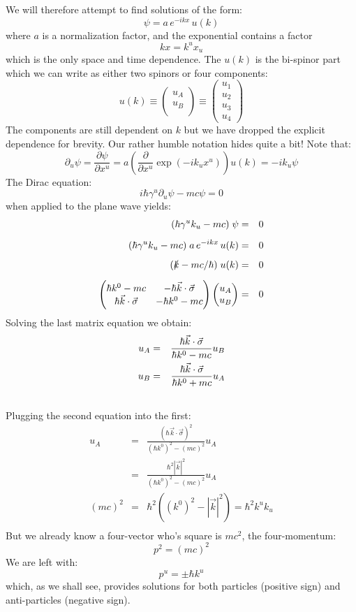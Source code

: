 \documentclass[12pt]{book}
\begin{document}
We will therefore attempt to find solutions of the form:
$$\psi = a \, e^{-ikx} \, u(k)$$
where $a$ is a normalization factor, and the exponential contains a factor
$$kx = k^u x_u$$
which is the only space and time dependence.  The $u(k)$ is the bi-spinor part which we can write as either two spinors or four components:
$$u(k) \equiv \begin{pmatrix} u_A \\ u_B \\ \end{pmatrix} \equiv 
\begin{pmatrix} u_1 \\ u_2\\ u_3 \\ u_4 \end{pmatrix}
$$
The components are still dependent on $k$ but we have dropped the explicit dependence for brevity.  Our rather humble notation hides quite a bit!  Note that:
$$\partial_u \psi = \frac{\partial \psi}{\partial x^u} = a \left( \frac{\partial}{\partial x^u} \exp(-ik_u x^u)\right) u(k) = -ik_u \psi$$
The Dirac equation:
$$i\hbar \gamma^u \partial_u \psi - mc \psi = 0$$
when applied to the plane wave yields:
\begin{eqnarray*}
(\hbar \gamma^u k_u - mc) \; \psi &=& 0 \\[5pt]
(\hbar \gamma^u k_u - mc) \; a \, e^{-ikx} \, u(k) &=& 0 \\[5pt]
(\slashed{k} - mc/\hbar) \; u(k) &=& 0 \\[5pt]
\begin{pmatrix}
\hbar k^0-mc & - \hbar \vec{k}\cdot\vec{\sigma} \\
\hbar \vec{k}\cdot\vec{\sigma} & -\hbar k^0-mc \\
\end{pmatrix}
\begin{pmatrix} 
u_A\\
u_B\\
\end{pmatrix}&=&0\\
\end{eqnarray*}
Solving the last matrix equation we obtain:
\begin{eqnarray}
u_A &=& \frac{\hbar\vec{k}\cdot\vec{\sigma}}{\hbar k^0-mc} u_B \label{eqn:ua} \\
u_B &=& \frac{\hbar\vec{k}\cdot\vec{\sigma}}{\hbar k^0+mc} u_A \label{eqn:ub} \\
\notag
\end{eqnarray}
Plugging the second equation into the first:
\begin{eqnarray*}
u_A &=& \frac{(\hbar\vec{k}\cdot\vec{\sigma})^2}{(\hbar k^0)^2-(mc)^2} u_A \\
    &=& \frac{\hbar^2|\vec{k}|^2}{(\hbar k^0)^2-(mc)^2} u_A \\
(mc)^2 &=& \hbar^2((k^0)^2-|\vec{k}|^2) = \hbar^2 k^u k_u \\
\end{eqnarray*}
But we already know a four-vector who's square is $mc^2$, the four-momentum:
$$p^2 = (mc)^2$$
We are left with:
$$p^u = \pm \hbar k^u$$
which, as we shall see, provides solutions for both particles (positive sign) and anti-particles (negative sign).\\[5pt]
\end{document}
